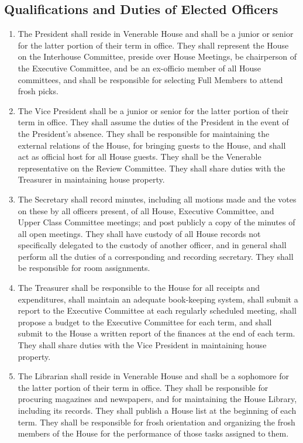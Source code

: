 \documentclass[10pt]{article} %
\begin{document}
\subsection{Qualifications and Duties of Elected Officers}
\label{ElectedDuties}
\begin{enumerate}
\item The President shall reside in Venerable House and shall be a junior or senior for the latter portion of their term in office. They shall represent the House on the Interhouse Committee, preside over House Meetings, be chairperson of the Executive Committee, and be an ex-officio member of all House committees, and shall be responsible for selecting Full Members to attend frosh picks.
\item The Vice President shall be a junior or senior for the latter portion of their term in office. They shall assume the duties of the President in the event of the President’s absence. They shall be responsible for maintaining the external relations of the House, for bringing guests to the House, and shall act as official host for all House guests. They shall be the Venerable representative on the Review Committee. They shall share duties with the Treasurer in maintaining house property.
\item The Secretary shall record minutes, including all motions made and the votes on these by all officers present, of all House, Executive Committee, and Upper Class Committee meetings; and post publicly a copy of the minutes of all open meetings. They shall have custody of all House records not specifically delegated to the custody of another officer, and in general shall perform all the duties of a corresponding and recording secretary. They shall be responsible for room assignments.
\item The Treasurer shall be responsible to the House for all receipts and expenditures, shall maintain an adequate book-keeping system, shall submit a report to the Executive Committee at each regularly scheduled meeting, shall propose a budget to the Executive Committee for each term, and shall submit to the House a written report of the finances at the end of each term. They shall share duties with the Vice President in maintaining house property.
\item The Librarian shall reside in Venerable House and shall be a sophomore for the latter portion of their term in office. They shall be responsible for procuring magazines and newspapers, and for maintaining the House Library, including its records. They shall publish a House list at the beginning of each term. They shall be responsible for frosh orientation and organizing the frosh members of the House for the performance of those tasks assigned to them.

\end{enumerate}
\end{document}
